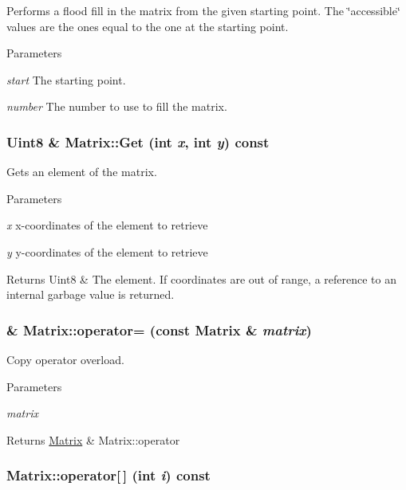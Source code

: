 Performs a flood fill in the matrix from the given starting point. The \char`\"{}accessible\char`\"{} values are the ones equal to the one at the starting point. 


\begin{DoxyParams}{Parameters}
\item[{\em start}]The starting point. \item[{\em number}]The number to use to fill the matrix. \end{DoxyParams}
\hypertarget{classMatrix_a06fc8df480cd88daf69eaa05867cb7bd}{
\subsubsection[{Get}]{\setlength{\rightskip}{0pt plus 5cm}Uint8 \& Matrix::Get (int {\em x}, \/  int {\em y}) const}}
\label{classMatrix_a06fc8df480cd88daf69eaa05867cb7bd}


Gets an element of the matrix. 


\begin{DoxyParams}{Parameters}
\item[{\em x}]x-\/coordinates of the element to retrieve \item[{\em y}]y-\/coordinates of the element to retrieve \end{DoxyParams}
\begin{DoxyReturn}{Returns}
Uint8 \& The element. If coordinates are out of range, a reference to an internal garbage value is returned. 
\end{DoxyReturn}
\hypertarget{classMatrix_a45e4814b752129bed1f1316632f8543a}{
\subsubsection[{operator=}]{ \& Matrix::operator= (const {\bf Matrix} \& {\em matrix})}}
\label{classMatrix_a45e4814b752129bed1f1316632f8543a}


Copy operator overload. 


\begin{DoxyParams}{Parameters}
\item[{\em matrix}]\end{DoxyParams}
\begin{DoxyReturn}{Returns}
\hyperlink{classMatrix}{Matrix} \& Matrix::operator 
\end{DoxyReturn}
\hypertarget{classMatrix_ab54bf109f85ced0472a7e0c03d16471c}{
\subsubsection[{operator[]}]{ Matrix::operator\mbox{[}$\,$\mbox{]} (int {\em i}) const}}
\label{classMatrix_ab54bf109f85ced0472a7e0c03d16471c}

